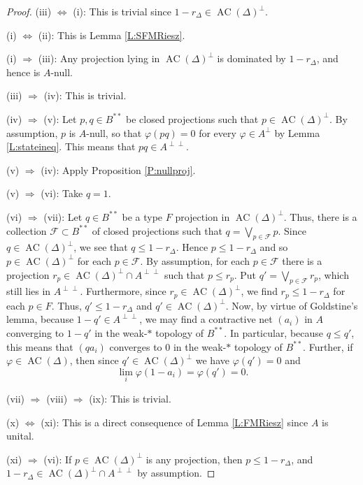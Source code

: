 \documentclass[10pt]{amsart}
\newcommand{\F}{{\mathcal{F}}}
\renewcommand{\phi}{\varphi}
\newcommand{\AC}{\operatorname{AC}}
\theoremstyle{definition}
\begin{document}
\begin{proof}
(iii) $\Leftrightarrow$ (i): This is trivial since $1-r_\Delta\in \AC(\Delta)^\perp$.

(i) $\Leftrightarrow$ (ii): This is Lemma \ref{L:SFMRiesz}.

(i) $\Rightarrow$ (iii): Any projection lying in $\AC(\Delta)^\perp$ is dominated by $1-r_\Delta$, and hence  is $A$-null.


(iii) $\Rightarrow$ (iv): This is trivial.

(iv) $\Rightarrow$ (v): Let $p,q\in B^{**}$ be closed projections such that $p\in \AC(\Delta)^\perp$. By assumption, $p$ is $A$-null, so that $\phi(pq)=0$ for every $\phi\in A^\perp$ by Lemma \ref{L:stateineq}. This means that $pq\in A^{\perp\perp}$.

(v) $\Rightarrow$ (iv): Apply Proposition \ref{P:nullproj}.

(v) $\Rightarrow$ (vi): Take $q=1$.


(vi) $\Rightarrow$ (vii): Let $q\in B^{**}$ be a type $F$ projection in $\AC(\Delta)^{\perp}$. Thus, there is a collection $\F\subset  B^{**}$ of closed projections such that $q=\bigvee_{p\in \F}p$. Since $q\in\AC(\Delta)^{\perp}$, we see that  $q\leq 1-r_\Delta$.  Hence $p\leq 1-r_\Delta$ and  so $p\in \AC(\Delta)^\perp$ for each $p\in \F$. By assumption, for each $p\in \F$ there is a projection $r_p\in \AC(\Delta)^\perp\cap A^{\perp\perp}$ such that $p\leq r_p$. Put $q'=\bigvee_{p\in \F}r_p$, which still lies in
 $A^{\perp\perp}$.  Furthermore, since $r_p\in \AC(\Delta)^\perp$, we find $r_p\leq 1-r_\Delta$ for each $p\in F$. Thus, $q'\leq 1-r_\Delta$ and $q'\in \AC(\Delta)^\perp$. Now, by virtue of Goldstine's lemma, because $1-q'\in A^{\perp\perp}$,  we may find a contractive net $(a_i)$ in $A$ converging to $1-q'$ in the weak-$*$ topology of $B^{**}$. In particular, because $q\leq q'$, this means that $(qa_i)$ converges to $0$ in the weak-$*$ topology of $B^{**}$. Further, if $\phi\in \AC(\Delta)$, then since $q'\in \AC(\Delta)^\perp$ we have $\phi(q')=0$ and
\[
\lim_i \phi(1-a_i)=\phi(q')=0.
\]

(vii) $\Rightarrow$ (viii) $\Rightarrow$ (ix): This is trivial.

(x) $\Leftrightarrow$ (xi): This is a direct consequence of Lemma \ref{L:FMRiesz} since $A$ is unital.

(xi) $\Rightarrow$ (vi): If $p\in \AC(\Delta)^\perp$ is any projection, then $p\leq 1-r_\Delta$, and $1-r_\Delta\in \AC(\Delta)^\perp\cap A^{\perp\perp}$ by assumption. 




\end{proof}
\end{document}
